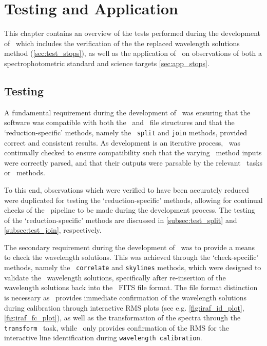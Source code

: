 \chapter{Testing and Application}

This chapter contains an overview of the tests performed during the development of \stops\ which includes the verification of the the replaced wavelength solutions method (\autoref{sec:test_stops}), as well as the application of \stops\ on observations of both a spectrophotometric standard and science targets \ref{sec:app_stops}.

\section[Testing \textsc{stops}]{Testing \stops} \label{sec:test_stops}



A fundamental requirement during the development of \stops\ was ensuring that the software was compatible with both the \polsalt\ and \iraf\ file structures and that the `reduction-specific' methods, namely the \stops\ \texttt{split} and \texttt{join} methods, provided correct and consistent results.
As development is an iterative process, \stops\ was continually checked to ensure compatibility such that the varying \stops\ method inputs were correctly parsed, and that their outputs were parsable by the relevant \iraf\ tasks or \polsalt\ methods.

To this end, observations which were verified to have been accurately reduced were duplicated for testing the `reduction-specific' methods, allowing for continual checks of the \stops\ pipeline to be made during the development process.
The testing of the `reduction-specific' methods are discussed in \autoref{subsec:test_split} and \autoref{subsec:test_join}, respectively.

The secondary requirement during the development of \stops\ was to provide a means to check the wavelength solutions.
This was achieved through the `check-specific' methods, namely the \stops\ \texttt{correlate} and \texttt{skylines} methods, which were designed to validate the \iraf\ wavelength solutions, specifically after re-insertion of the wavelength solutions back into the \polsalt\ \gls{FITS} file format.
The file format distinction is necessary as \iraf\ provides immediate confirmation of the wavelength solutions during calibration through interactive \gls{RMS} plots (see e.g. \autoref{fig:iraf_id_plot}, \ref{fig:iraf_fc_plot}), as well as the transformation of the spectra through the \texttt{transform} \iraf\ task, while \polsalt\ only provides confirmation of the \gls{RMS} for the interactive line identification during \texttt{wavelength calibration}.

